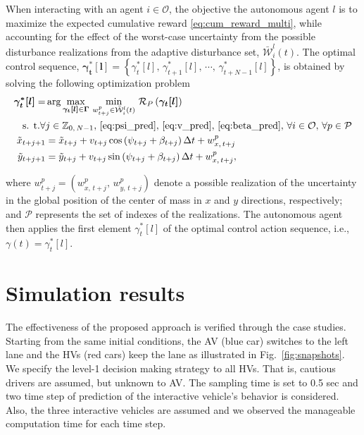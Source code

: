 \documentclass[10pt,journal]{IEEEtran}
\newcommand{\optactseq}[1]{\boldsymbol{\gamma^{*}_{t}[#1]} = \left\{\gamma^{*}_{t}[#1],\,\gamma^{*}_{t+1}[#1],\,\cdots,\,\gamma^{*}_{t+N-1}[#1]\right\}}
\newcommand{\optact}[1]{\gamma^{*}_{t}[#1]}
\begin{document}
	When interacting with an agent $i\in \mathcal{O}$, the objective the autonomous agent $l$ is to maximize the expected cumulative reward \eqref{eq:cum_reward_multi}, while accounting for the effect of the worst-case uncertainty from the possible disturbance realizations from the adaptive disturbance set, $\bar{\mathcal{W}}_{i}^{l}(t)$. The optimal control sequence, $\optactseq{l}$, is obtained by solving the following optimization problem
	\begin{subequations}
		\begin{align}
			\boldsymbol{\gamma^{*}_{t}[l]} =  & \arg \underset {\boldsymbol{\gamma_{t}[l]} \in  \boldsymbol{\Gamma}} {\max}\, \, \underset{w_{t+j}^{p} \in \bar{\mathcal{W}}_{i}^{l}(t)}{\min} \, \, \mathcal{R}_P\left(\boldsymbol{\gamma_{t}[l]}\right) \\
			\textrm{s. t.} \forall &  j \in \mathbb{Z}_{0,\,N-1},\, \eqref{eq:psi_pred},\, \eqref{eq:v_pred},\, \eqref{eq:beta_pred} ,\,\forall i \in \mathcal{O},\, \forall p \in \mathcal{P} \nonumber \\
			\tilde{x}_{t+j+1} & = 	\tilde{x}_{t+j} + v_{t+j} \cos\left(\psi_{t+j} + \beta_{t+j} \right) \Delta t + w_{x,\,t+j}^{p}\\ 
			\tilde{y}_{t+j+1} & = 	\tilde{y}_{t+j} + v_{t+j} \sin\left(\psi_{t+j} + \beta_{t+j} \right) \Delta t + w_{x,\,t+j}^{p},
			\label{eq:control_action_model}
		\end{align}
	\end{subequations}

	
	\noindent where $w_{t+j}^{p} = \left(w_{x,\,t+j}^{p},\, w_{y,\,t+j}^{p}\right)$ denote a possible realization of the uncertainty in the global position of the center of mass in $x$ and $y$ directions, respectively; and $\mathcal{P}$ represents the set of indexes of the realizations. The autonomous agent then applies the first element $\optact{l}$ of the optimal control action sequence, i.e.,  $\gamma\left(t\right) = \optact{l}$.
	

	
	
	

	
	\section{Simulation results}
	\label{sec:sim_results}
	The effectiveness of the proposed approach is verified through the case studies. Starting from the same initial conditions, the AV (blue car) switches to the left lane and the HVs (red cars) keep the lane as illustrated in Fig.~\ref{fig:snapshots}. We specify the level-1 decision making strategy to all HVs. That is, cautious drivers are assumed, but unknown to AV. The sampling time is set to 0.5 sec and two time step of prediction of the interactive vehicle's behavior is considered. Also, the three interactive vehicles are assumed and we observed the manageable computation time for each time step. 
\end{document}
